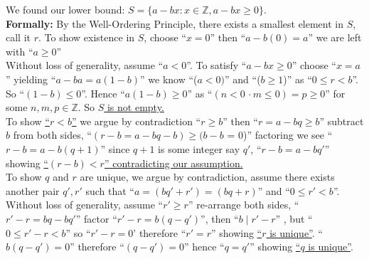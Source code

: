 \begin{Proof} 
    \noindent
    We found our lower bound: \Large{$S=\{a-bx:x\in\mathbb{Z}, a-bx\geq0\}$.}\\

    \normalsize
    \noindent
    \textbf{Formally:} By the Well-Ordering Principle, there exists a smallest element in $S$, call it $r$.
    To show existence in $S$, choose ``$x=0$'' then ``$a-b(0)=a$'' we are left with ``$a\geq 0$''\\

    \noindent
    Without loss of generality, assume ``$a<0$''. To satisfy ``$a-bx\geq0$'' choose ``$x=a$'' yielding
    ``$a-ba=a(1-b)$'' we know ``($a<0)$'' and ``($b\geq1$)'' as ``$0\leq r <b$''. So ``$(1-b)\leq0$''. Hence
    ``$a(1-b)\geq0$'' as ``$(n<0\,\cdot m\leq0)=p\geq0$'' for some $n,m,p\in\mathbb{Z}$. So \underline{$S$ is not empty.}\\

    \noindent
    To show \underline{``$r<b$''} we argue by contradiction ``$r\geq b$'' then ``$r=a-bq\geq b$'' subtract $b$ from both sides,
    ``$(r-b=a-bq-b)\geq (b-b$ = 0)'' factoring we see ``$r-b=a-b(q+1)$'' since
    $q+1$ is some integer say $q'$, ``$r-b=a-bq'$'' showing \underline{``$(r-b)<r$'' contradicting our assumption.}\\

        \noindent
        To show $q$ and $r$ are unique, we argue by contradiction, assume there exists another pair $q',r'$
        such that ``$a=(bq'+r')=(bq+r)$'' and ``$0\leq r'<b$''. Without loss of generality, assume ``$r'\geq r$''
        re-arrange both sides, ``$r'-r=bq-bq'$'' factor ``$r'-r=b(q-q')$'', then ``$b\mid r'-r$''
        , but ``$0\leq r'-r<b$'' so ``$r'-r=0$' therefore ``$r'=r$'' showing \underline{``$r$ is unique''}.
        ``$b(q-q')=0$'' therefore ``$(q-q')=0$'' hence ``$q=q'$'' showing \underline{``$q$ is unique''}.
\end{Proof}



